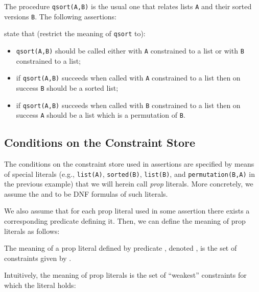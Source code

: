 \documentclass{llncs}
\newcommand{\kbd}[1]{\mbox{\tt #1}}
\newcommand{\skbd}[1]{\mbox{\tt\small{#1}}}
\begin{document}
\begin{example}
  \label{ex:qsortasrt}
  The procedure \skbd{qsort(A,B)} is the usual one 
  that relates lists \skbd{A} and their sorted versions \skbd{B}. 
  The following assertions:
\begin{small}
    
  \end{small}
state that (restrict the meaning of \kbd{qsort} to):
  \vspace{-0.8em}
  \begin{itemize}
    \item \skbd{qsort(A,B)} should be called either with \skbd{A}
      constrained to a list or with \kbd{B} constrained to a list;
    \item if \skbd{qsort(A,B)} succeeds when called with \skbd{A}
      constrained to a list then on success \skbd{B} should be a
      sorted list; 
    \item if \skbd{qsort(A,B)} succeeds when called with \skbd{B}
      constrained to a list then on success \skbd{A} should be a list
      which is a permutation of \skbd{B}.
  \end{itemize}
\end{example}



\subsection{Conditions on the Constraint Store}

The conditions on the constraint store used in assertions are
specified by means of special literals (e.g., \skbd{list(A)},
\skbd{sorted(B)}, \skbd{list(B)}, and \skbd{permutation(B,A)}
in the previous example) that we will herein call \emph{prop}
literals. More concretely, we assume the  and  to be
DNF formulas of such literals.

We also assume that for each prop literal  used in some
assertion there exists a corresponding predicate  defining it.
Then, we can define the meaning of prop literals as follows:

\begin{definition} 
  The meaning of a prop literal  defined by predicate ,
  denoted , is the set of constraints given by
  .
\end{definition}

Intuitively, the meaning of prop literals is the set of ``weakest''
constraints for which the literal holds:
\end{document}
